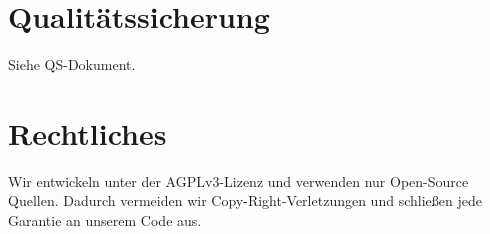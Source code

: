 \documentclass[accentcolor=tud0b,12pt,paper=a4]{tudreport}
\begin{document}
{\let\clearpage\relax	\chapter{Qualitätssicherung}}

	Siehe QS-Dokument.

	
{\let\clearpage\relax	\chapter{Rechtliches}}
	
	Wir entwickeln unter der AGPLv3-Lizenz und verwenden nur Open-Source Quellen. Dadurch vermeiden wir Copy-Right-Verletzungen und schließen jede Garantie an unserem Code aus.
	
\end{document}
